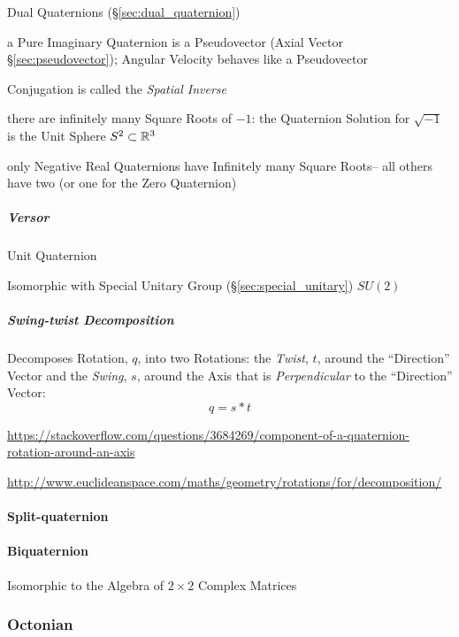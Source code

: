 \fist Dual Quaternions (\S\ref{sec:dual_quaternion})

a Pure Imaginary Quaternion is a Pseudovector (Axial Vector
\S\ref{sec:pseudovector}); Angular Velocity behaves like a Pseudovector

Conjugation is called the \emph{Spatial Inverse}

there are infinitely many Square Roots of $-1$: the Quaternion Solution for
$\sqrt{-1}$ is the Unit Sphere $S^2 \subset \mathbb{R}^3$

only Negative Real Quaternions have Infinitely many Square Roots-- all others
have two (or one for the Zero Quaternion)



\subparagraph{Versor}\label{sec:versor}\hfill

Unit Quaternion

Isomorphic with Special Unitary Group (\S\ref{sec:special_unitary}) $SU(2)$



\subparagraph{Swing-twist Decomposition}\label{sec:swing_twist}\hfill

Decomposes Rotation, $q$, into two Rotations: the \emph{Twist}, $t$, around the
``Direction'' Vector and the \emph{Swing}, $s$, around the Axis that is
\emph{Perpendicular} to the ``Direction'' Vector:
\[
  q = s * t
\]

\url{https://stackoverflow.com/questions/3684269/component-of-a-quaternion-rotation-around-an-axis}

\url{http://www.euclideanspace.com/maths/geometry/rotations/for/decomposition/}



\paragraph{Split-quaternion}\label{sec:split_quaternion}\hfill

\paragraph{Biquaternion}\label{sec:biquaternion}\hfill

Isomorphic to the Algebra of $2 \times 2$ Complex Matrices



\subsubsection{Octonian}\label{sec:octonian}

